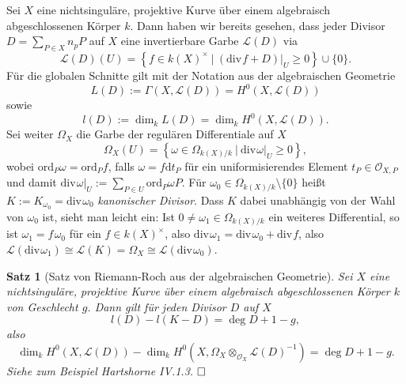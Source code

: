 \documentclass[11pt]{book}
\newtheorem{theorem}{Satz}[section]
\theoremstyle{nonumberbreak}
\newenvironment{pr}[1][]{\ifthenelse{\equal{#1}{}}{\proof}{\proof[#1]}\rm}{\endproof}
\begin{document}
\begin{spacing}{1.4}
Sei $X$ eine nichtsinguläre, projektive Kurve über einem algebraisch abgeschlossenen Körper $k$. Dann haben wir bereits gesehen, dass jeder Divisor $D= \sum_{P \in X} n_p P$ auf $X$ eine invertierbare Garbe $\mathcal{L}(D)$ via
$$\mathcal{L}(D)(U) = \left\{ f \in k(X)^{\times} \ \vert \ \left( \mathrm{div} \hspace{1pt} f + D \right)\vert_U \geqslant 0 \right\} \cup \{0\}.$$
Für die globalen Schnitte gilt mit der Notation aus der algebraischen Geometrie
$$L(D):= \Gamma(X, \mathcal{L}(D))= H^{0}(X, \mathcal{L}(D))$$
sowie 
$$l(D):= \dim_k L(D) = \dim_k H^{0}(X, \mathcal{L}(D)).$$
Sei weiter $\Omega_X$ die Garbe der regulären Differentiale auf $X$
$$\Omega_X(U)= \left\{ \omega \in \Omega_{k(X)/k} \ \vert \ \mathrm{div}\hspace{1pt} \omega\vert_U \geqslant 0 \right\},$$
wobei $\mathrm{ord}_P \omega = \mathrm{ord}_P f$, falls $\omega = f \mathrm{d}t_P$ für ein uniformisierendes Element $t_P \in \mathcal{O}_{X,P}$ und damit $\mathrm{div}\hspace{1pt} \omega\vert_U := \sum_{P \in U} \mathrm{ord}_P \omega P$. Für $\omega_0 \in \Omega_{k(X)/k} \setminus \{0\}$ heißt $K:=K_{\omega_0} = \mathrm{div} \hspace{1pt} \omega_0$ \textit{kanonischer Divisor}. Dass $K$ dabei unabhängig von der Wahl von $\omega_0$ ist, sieht man leicht ein: Ist $0 \neq \omega_1  \in \Omega_{k(X)/k}$ ein weiteres Differential, so ist $\omega_1 = f \hspace{1pt} \omega_0$ für ein $f \in k(X)^{\times}$, also $\mathrm{div} \hspace{1pt} \omega_1 = \mathrm{div}\hspace{1pt} \omega_0 + \mathrm{div} \hspace{1pt} f$, also $\mathcal{L}( \mathrm{div}\hspace{1pt} \omega_1) \cong \mathcal{L}(K) = \Omega_X\cong \mathcal{L}(\mathrm{div}\hspace{1pt} \omega_0)$.



\begin{theorem}[Satz von Riemann-Roch aus der algebraischen Geometrie]
Sei $X$ eine nichtsinguläre, projektive Kurve über einem algebraisch abgeschlossenen Körper $k$ von Geschlecht $g$. Dann gilt für jeden Divisor $D$ auf $X$
$$l(D) - l(K-D) = \deg D + 1 -g,$$
also
$$\dim_k H^{0}(X, \mathcal{L}(D)) - \dim_k H^{0}(X, \Omega_X \otimes_{\mathcal{O}_X} \mathcal{L}(D)^{-1}) = \deg D +1 -g.$$
\begin{pr}
Siehe zum Beispiel Hartshorne IV.1.3. $\hfill \Box$
\end{pr}


\end{theorem}
\end{spacing}
\end{document}
